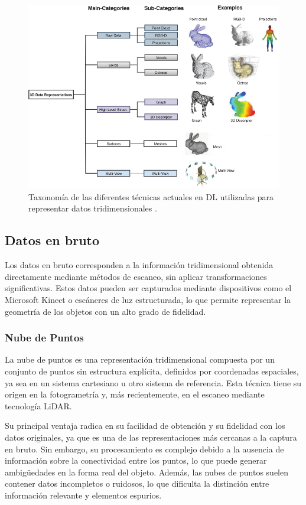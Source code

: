 \begin{figure}[h]
    \centering
    \includegraphics[width=\linewidth]{figures/2_theory/3Dtaxonomy.png}
    \caption[Taxonomía de las representaciones 3D para Deep Learning]{Taxonomía de las diferentes técnicas actuales en DL utilizadas para representar datos tridimensionales \cite{gezawa_review_2020}.}
    \label{fig:3dTaxonomy}
\end{figure}

\subsection{Datos en bruto}
Los datos en bruto corresponden a la información tridimensional obtenida directamente mediante métodos de escaneo, sin aplicar transformaciones significativas. Estos datos pueden ser capturados mediante dispositivos como el Microsoft Kinect o escáneres de luz estructurada, lo que permite representar la geometría de los objetos con un alto grado de fidelidad.

\subsubsection{Nube de Puntos}
La nube de puntos es una representación tridimensional compuesta por un conjunto de puntos sin estructura explícita, definidos por coordenadas espaciales, ya sea en un sistema cartesiano u otro sistema de referencia. Esta técnica tiene su origen en la fotogrametría y, más recientemente, en el escaneo mediante tecnología LiDAR.

Su principal ventaja radica en su facilidad de obtención y su fidelidad con los datos originales, ya que es una de las representaciones más cercanas a la captura en bruto. Sin embargo, su procesamiento es complejo debido a la ausencia de información sobre la conectividad entre los puntos, lo que puede generar ambigüedades en la forma real del objeto. Además, las nubes de puntos suelen contener datos incompletos o ruidosos, lo que dificulta la distinción entre información relevante y elementos espurios.

